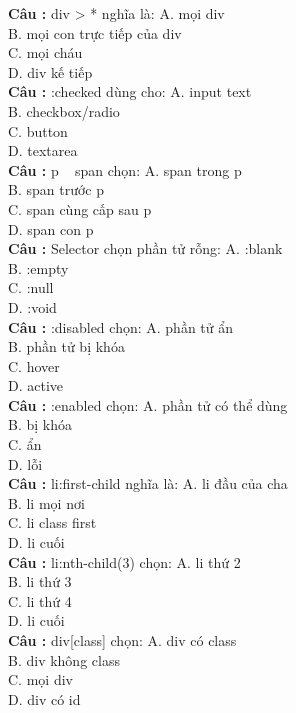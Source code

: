 \documentclass[12pt,a4paper]{article}
\begin{document}
\textbf{Câu :} div > * nghĩa là:
A. mọi div \\
B. mọi con trực tiếp của div \\
C. mọi cháu \\
D. div kế tiếp \\

\textbf{Câu :} :checked dùng cho:
A. input text \\
B. checkbox/radio \\
C. button \\
D. textarea \\

\textbf{Câu :} p ~ span chọn:
A. span trong p \\
B. span trước p \\
C. span cùng cấp sau p \\
D. span con p \\

\textbf{Câu :} Selector chọn phần tử rỗng:
A. :blank \\
B. :empty \\
C. :null \\
D. :void \\

\textbf{Câu :} :disabled chọn:
A. phần tử ẩn \\
B. phần tử bị khóa \\
C. hover \\
D. active \\

\textbf{Câu :} :enabled chọn:
A. phần tử có thể dùng \\
B. bị khóa \\
C. ẩn \\
D. lỗi \\

\textbf{Câu :} li:first-child nghĩa là:
A. li đầu của cha \\
B. li mọi nơi \\
C. li class first \\
D. li cuối \\

\textbf{Câu :} li:nth-child(3) chọn:
A. li thứ 2 \\
B. li thứ 3 \\
C. li thứ 4 \\
D. li cuối \\

\textbf{Câu :} div[class] chọn:
A. div có class \\
B. div không class \\
C. mọi div \\
D. div có id \\
\end{document}
